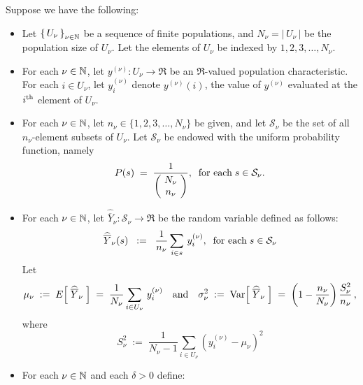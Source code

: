 \begin{theorem}
\mbox{}
\vskip 0.1cm
\noindent
Suppose we have the following:
\begin{itemize}
\item Let $\left\{\,U_{\nu}\,\right\}_{\nu \in \mathbb{N}}$ be a sequence of finite populations,
and $N_{\nu} = \left\vert\,U_{\nu}\,\right\vert$ be the population size of $U_{\nu}$.
Let the elements of $U_{\nu}$ be indexed by $1,2,3,\ldots,N_{\nu}$.
\item For each $\nu \in \mathbb{N}$, let $y^{(\nu)} : U_{\nu} \longrightarrow \Re$ be an $\Re$-valued population characteristic.
For each $i \in U_{\nu}$, let $y^{(\nu)}_{i}$ denote $y^{(\nu)}(i)$,
the value of $y^{(\nu)}$ evaluated at the $i^{\textnormal{th}}$ element of $U_{\nu}$.
\item For each $\nu \in \mathbb{N}$, let $n_{\nu} \in \{ 1,2,3,\ldots,N_{\nu} \}$ be given,
and let $\mathcal{S}_{\nu}$ be the set of all $n_{\nu}$-element subsets of $U_{\nu}$.
Let $\mathcal{S}_{\nu}$ be endowed with the uniform probability function, namely
\begin{equation*}
P(s) \; = \; \dfrac{1}{\left(\!\begin{array}{c} N_{\nu} \\ n_{\nu} \end{array}\!\right)},
\;\;\textnormal{for each}\; s \in \mathcal{S}_{\nu}.
\end{equation*}
\item For each $\nu \in \mathbb{N}$, let $\widehat{\overline{Y}}_{\nu} : \mathcal{S}_{\nu} \longrightarrow \Re$ be the random variable
defined as follows:
\begin{equation*}
\widehat{\overline{Y}}_{\nu}(s)
\;\;:=\;\;
\dfrac{1}{n_{\nu}}\sum_{i \in s}\, y^{(\nu)}_{i},
\;\;\textnormal{for each}\; s \in \mathcal{S}_{\nu}
\end{equation*}
Let
\begin{equation*}
\mu_{\nu} \;:=\; E\!\left[\;\widehat{\overline{Y}}_{\nu}\;\right] \;=\; \dfrac{1}{N_{\nu}}\sum_{i \in U_{\nu}}\,y^{(\nu)}_{i}
\quad\textnormal{and}\quad
\sigma^{2}_{\nu} \;:=\; \textnormal{Var}\!\left[\;\widehat{\overline{Y}}_{\nu}\;\right] \;=\; \left(1 - \dfrac{n_{\nu}}{N_{\nu}}\right)\dfrac{S^{2}_{\nu}}{n_{\nu}}\,,
\end{equation*}
where
\begin{equation*}
S^{2}_{\nu} \;:=\; \dfrac{1}{N_{\nu} - 1}\sum_{i \in U_{\nu}}\left(y^{(\nu)}_{i} - \mu_{\nu}\right)^{2}
\end{equation*}
\item For each $\nu \in \mathbb{N}$ and each $\delta > 0$ define:

\end{itemize}
\end{theorem}
